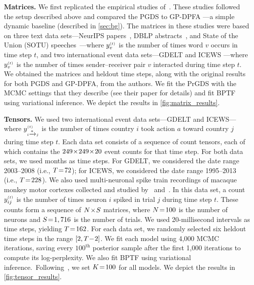 \documentclass{article}
\begin{document}
\textbf{Matrices.} We first replicated the empirical studies of~\citet{schein2016poisson}. These studies followed the setup described above and compared the PGDS to GP-DPFA \cite{acharya2015nonparametric}---a simple dynamic baseline (described in \cref{sec:bg}). The matrices in these studies were based on three text data sets---NeurIPS papers~\cite{neuripscorpus}, DBLP abstracts~\cite{dblp}, and State of the Union (SOTU) speeches~\cite{sotu}---where $\yvt$ is the number of times word $v$ occurs in time step $t$, and two international event data sets---GDELT \cite{leetaru2013gdelt} and ICEWS \cite{boscheeicews}---where $\yvt$ is the number of times sender--receiver pair $v$ interacted during time step $t$. We obtained the matrices and heldout time steps, along with the original results for both PGDS and GP-DPFA, from the authors. We fit the PrGDS with the MCMC settings that they describe (see their paper  \cite{schein2016poisson} for details) and fit BPTF using variational inference. We depict the results in \cref{fig:matrix_results}.~

\textbf{Tensors.} We used two international event data sets---GDELT and ICEWS---where $y_{\mathsmaller{i \xrightarrow{a}j}}^{\mathsmaller{(t)}}$ is the number of times country $i$ took action $a$ toward country $j$ during time step $t$.
Each data set consists of a sequence of count tensors, each of which contains the $249 \!\times\! 249 \!\times\! 20$ event counts for that time step. For both data sets, we used months as time steps. For GDELT, we considered the date range 2003--2008 (i.e., $T \!=\! 72$); for ICEWS, we considered the date range 1995--2013 (i.e., $T \!=\! 228$). We also used multi-neuronal spike train recordings of macaque monkey motor cortexes collected and studied by~\citet{vyas2018neural} and~\citet{williams2018unsupervised}.  In this data set, a count $y^{\mathsmaller{(t)}}_{ij}$ is the number of times neuron $i$ spiked in trial $j$ during time step $t$. These counts form a sequence of $N \!\times\! S$ matrices, where $N \!=\! 100$ is the number of neurons and $S \!=\! 1,716$ is the number of trials. We used 20-millisecond intervals as time steps, yielding $T \!=\! 162$. For each data set, we randomly selected six heldout time steps in the range $[2, T\!-\! 2]$. We fit each model using 4,000 MCMC iterations, saving every $100^{\textrm{th}}$ posterior sample after the first 1,000 iterations to compute its log-perplexity. We also fit BPTF using variational inference.~Following~\citet{schein2016poisson}, we set $K \!=\! 100$ for all models. We depict the results in \cref{fig:tensor_results}.
\end{document}
